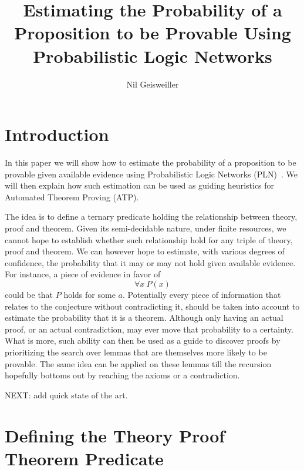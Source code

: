 \documentclass{easychair}
\title{Estimating the Probability of a Proposition to be Provable
  Using Probabilistic Logic Networks}
\author{Nil Geisweiller}
\institute{
  SingularityNET Foundation,\\
  Zug, Switzerland\\
  \email{nil@singularitynet.io}
}
\begin{document}
\maketitle

\begin{abstract}
\end{abstract}

\section{Introduction}

In this paper we will show how to estimate the probability of a
proposition to be provable given available evidence using
Probabilistic Logic Networks (PLN)~\cite{Goertzel09PLN}.  We will then
explain how such estimation can be used as guiding heuristics for
Automated Theorem Proving (ATP).

The idea is to define a ternary predicate holding the relationship
between theory, proof and theorem.  Given its semi-decidable nature,
under finite resources, we cannot hope to establish whether such
relationship hold for any triple of theory, proof and theorem.  We can
however hope to estimate, with various degrees of confidence, the
probability that it may or may not hold given available evidence.  For
instance, a piece of evidence in favor of
$$\forall x \ P(x)$$ could be that $P$ holds for some $a$.
Potentially every piece of information that relates to the conjecture
without contradicting it, should be taken into account to estimate the
probability that it is a theorem.  Although only having an actual
proof, or an actual contradiction, may ever move that probability to a
certainty.  What is more, such ability can then be used as a guide to
discover proofs by prioritizing the search over lemmas that are
themselves more likely to be provable.  The same idea can be applied
on these lemmas till the recursion hopefully bottoms out by reaching
the axioms or a contradiction.

NEXT: add quick state of the art.

\section{Defining the Theory Proof Theorem Predicate}
\end{document}

